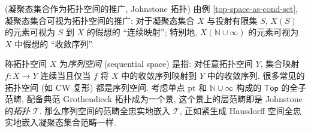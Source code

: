 \begin{remark}
	[label={remark-topological-topos}]
	{(凝聚态集合作为拓扑空间的推广, Johnstone 拓扑\topos{})}
	由例 \ref{top-space-as-cond-set}, 凝聚态集合可视为拓扑空间的推广: 对于凝聚态集合 $X$ 与投射有限集 $S$, $X(S)$ 的元素可视为 $S$ 到 $X$ 的假想的 ``连续映射''; 
	特别地, $X(\mathbb{N}\cup\infty)$ 的元素可视为 $X$ 中假想的 ``收敛序列''.
	
	称拓扑空间 $X$ 为\emph{序列空间} (sequential space) 是指: 对任意拓扑空间 $Y$, 集合映射 $f\colon X\to Y$ 连续当且仅当 $f$ 将 $X$ 中的收敛序列映射到 $Y$ 中的收敛序列. 很多常见的拓扑空间 (如 CW 复形) 都是序列空间.
	考虑单点 $\text{pt}$ 和 $\mathbb{N}\cup\infty$ 构成的 $\mathsf {Top}$ 的全子范畴, 配备典范 Grothendieck 拓扑成为一个景, 这个景上的层范畴即是 Johnstone 的\emph{拓扑\topos{}} $\mathcal T$. 那么序列空间的范畴全忠实地嵌入 $\mathcal T$, 正如紧生成 Hausdorff 空间全忠实地嵌入凝聚态集合范畴一样.
\end{remark}